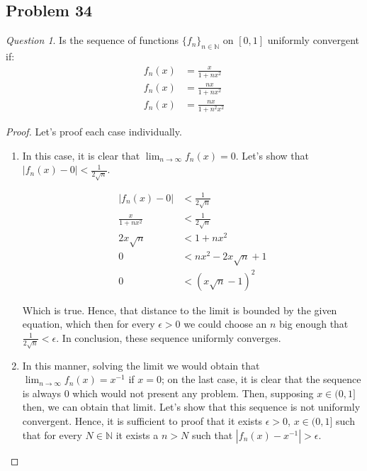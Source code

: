 \documentclass[11pt]{article}
\theoremstyle{definition}
\theoremstyle{remark}
\theoremstyle{remark}
\newtheorem{question}{Question}
\newcommand{\N}{\mathbb{N}}
\newcommand{\ri}{\rightarrow}
\begin{document}
\subsection{Problem 34}
\begin{question}
  Is the sequence of functions $\{f_n\}_{n \in \N}$ on $[0, 1]$
  uniformly convergent if:
  \begin{equation*}
    \begin{split}
      f_n(x) &= \frac{x}{1 + nx^2} \\
      f_n(x) &= \frac{nx}{1 + nx^2} \\
      f_n(x) &= \frac{nx}{1 + n^2x^2}
    \end{split}
  \end{equation*}
\end{question}

\begin{proof}
  Let's proof each case individually.
  \begin{enumerate}
  \item In this case, it is clear that $\lim_{n \ri \infty}
    f_n(x)=0$. Let's show that $|f_n(x) - 0| < \frac{1}{2\sqrt{n}}$.

    \begin{equation*}
      \begin{split}
        |f_n(x) - 0| &< \frac{1}{2\sqrt{n}} \\
        \frac{x}{1+nx^2} &< \frac{1}{2\sqrt{n}} \\
        2x\sqrt{n} &< 1 + nx^2 \\
        0 &< nx^2 - 2x\sqrt{n} + 1 \\
        0 &< (x\sqrt{n} - 1)^2
      \end{split}
    \end{equation*}

    Which is true. Hence, that distance to the limit is bounded by
    the given equation, which then for every $\epsilon > 0$ we could
    choose an $n$ big enough that $\frac{1}{2\sqrt{n}} < \epsilon$.
    In conclusion, these sequence uniformly converges.

  \item In this manner, solving the limit we would obtain that
    $\lim_{n \ri \infty} f_n(x)=x^{-1}$ if $x = 0$; on the last case,
    it is clear that the sequence is always 0 which would not present
    any problem. Then, supposing $x \in (0,1]$ then, we can obtain
    that limit. Let's show that this sequence is not uniformly
    convergent. Hence, it is sufficient to proof that it exists
    $\epsilon >0$, $x \in (0,1]$ such that for every
    $N \in \N$ it exists a $n > N$ such that
    $|f_n(x) - x^{-1}| > \epsilon$.


\end{enumerate}
\end{proof}
\end{document}
